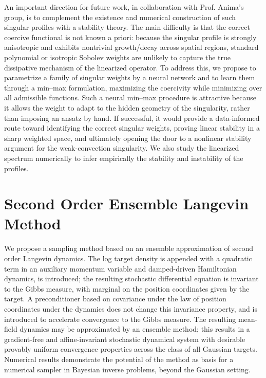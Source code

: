 \documentclass[12pt]{caltech_thesis}
\numberwithin{equation}{section}
\begin{document}
An important direction for future work, in collaboration with Prof. Anima's group, is to complement the existence and numerical construction of such singular profiles with a stability theory. The main difficulty is that the correct coercive functional is not known a priori: because the singular profile is strongly anisotropic and exhibits nontrivial growth/decay across spatial regions, standard polynomial or isotropic Sobolev weights are unlikely to capture the true dissipative mechanism of the linearized operator. To address this, we propose to parametrize a family of singular weights by a neural network and to learn them through a min--max formulation, maximizing the coercivity while minimizing over all admissible functions. 
Such a neural min--max procedure is attractive because it allows the weight to adapt to the hidden geometry of the singularity, rather than imposing an ansatz by hand. If successful, it would provide a data-informed route toward identifying the correct singular weights, proving linear stability in a sharp weighted space, and ultimately opening the door to a nonlinear stability argument for the weak-convection singularity. We also study the linearized spectrum numerically to infer empirically the stability and instability of the profiles.

\chapter{Second Order Ensemble Langevin Method}
\label{append:ehmc}
We propose a sampling method based on an ensemble approximation of second order Langevin dynamics. {The log target density is appended with a quadratic term in an auxiliary momentum variable and 
damped-driven Hamiltonian dynamics, is introduced; the resulting stochastic
    differential equation is invariant to the Gibbs measure, with marginal on
    the position coordinates given by the target. A preconditioner based on 
covariance under the law of {position coordinates under}
the dynamics does not change this invariance property, and is introduced 
to accelerate convergence to the Gibbs measure.}
        The resulting mean-field dynamics may be approximated by an ensemble 
method; this results in a gradient-free and affine-invariant stochastic 
dynamical system {with desirable provably 
uniform convergence properties across
the class of all Gaussian targets.} Numerical results demonstrate the
potential of the method as basis for a numerical sampler in Bayesian inverse 
problems, {beyond the Gaussian setting.}
\end{document}
